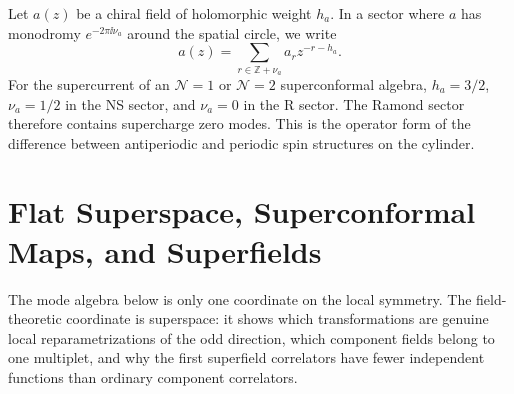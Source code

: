 Let \(a(z)\) be a chiral field of holomorphic weight \(h_a\).  In a sector
where \(a\) has monodromy \(e^{-2\pi \ii \nu_a}\) around the spatial circle,
we write
\begin{equation}
  a(z)=\sum_{r\in\mathbb Z+\nu_a} a_r z^{-r-h_a}.
  \label{eq:spin-cft-chiral-mode-expansion}
\end{equation}
For the supercurrent of an \(\mathcal N=1\) or \(\mathcal N=2\)
superconformal algebra, \(h_a=3/2\), \(\nu_a=1/2\) in the NS sector, and
\(\nu_a=0\) in the R sector.  The Ramond sector therefore contains
supercharge zero modes.  This is the operator form of the difference between
antiperiodic and periodic spin structures on the cylinder.

\section{Flat Superspace, Superconformal Maps, and Superfields}
\label{sec:n1-local-supergeometry-superfields}

The mode algebra below is only one coordinate on the local symmetry.  The
field-theoretic coordinate is superspace: it shows which transformations are
genuine local reparametrizations of the odd direction, which component fields
belong to one multiplet, and why the first superfield correlators have fewer
independent functions than ordinary component correlators.

